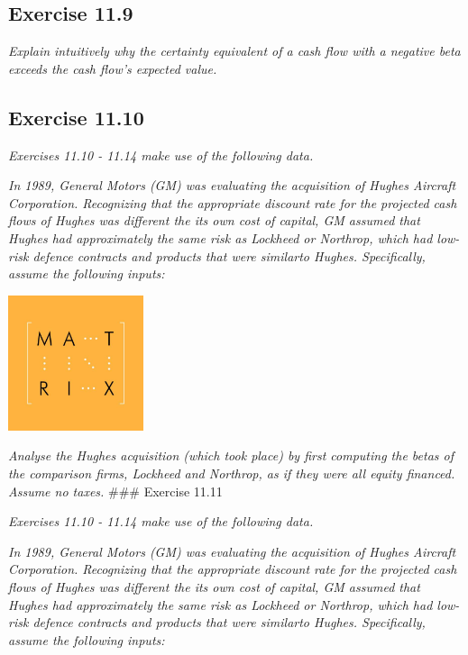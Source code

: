 \documentclass[]{book}
\theoremstyle{definition}
\theoremstyle{definition}
\theoremstyle{remark}
\begin{document}
\subsection{Exercise 11.9}\label{exercise-11.9}

\emph{Explain intuitively why the certainty equivalent of a cash flow
with a negative beta exceeds the cash flow's expected value.}
\citep[p.389]{book}

\subsection{Exercise 11.10}\label{exercise-11.10}

\emph{Exercises 11.10 - 11.14 make use of the following data.}
\citep[p.389]{book}

\emph{In 1989, General Motors (GM) was evaluating the acquisition of
Hughes Aircraft Corporation. Recognizing that the appropriate discount
rate for the projected cash flows of Hughes was different the its own
cost of capital, GM assumed that Hughes had approximately the same risk
as Lockheed or Northrop, which had low-risk defence contracts and
products that were similarto Hughes. Specifically, assume the following
inputs:} \citep[p.389]{book}

\begin{center}\includegraphics[width=150px]{figures/matrix} \end{center}

\emph{Analyse the Hughes acquisition (which took place) by first
computing the betas of the comparison firms, Lockheed and Northrop, as
if they were all equity financed. Assume no taxes.} \citep[p.390]{book}
\#\#\# Exercise 11.11

\emph{Exercises 11.10 - 11.14 make use of the following data.}
\citep[p.389]{book}

\emph{In 1989, General Motors (GM) was evaluating the acquisition of
Hughes Aircraft Corporation. Recognizing that the appropriate discount
rate for the projected cash flows of Hughes was different the its own
cost of capital, GM assumed that Hughes had approximately the same risk
as Lockheed or Northrop, which had low-risk defence contracts and
products that were similarto Hughes. Specifically, assume the following
inputs:} \citep[p.389]{book}
\end{document}
